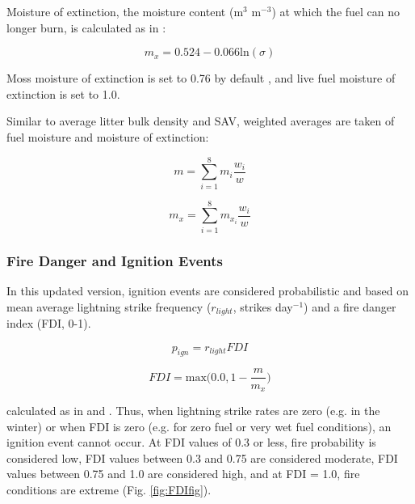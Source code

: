 \documentclass[a4paper, 12pt] {report}
\begin{document}
Moisture of extinction, the moisture content (m$^3$ m$^{-3}$) at which the fuel can no longer burn, is calculated as in \cite{petersonModelingPostfireConifer1986}:

\begin{equation}
	m_x = 0.524 - 0.066\text{ln}(\sigma) 
\end{equation}

Moss moisture of extinction is set to 0.76 by default \cite{frandsenIgnitionProbabilityOrganic1997}, and live fuel moisture of extinction is set to 1.0.

Similar to average litter bulk density and SAV, weighted averages are taken of fuel moisture and moisture of extinction:

\begin{equation} 
	m = \sum_{i=1}^{8} m_i\frac{w_i}{w}
\end{equation}

\begin{equation} 
	m_x = \sum_{i=1}^{8} m_{x_i}\frac{w_i}{w}
\end{equation}

\subsubsection{Fire Danger and Ignition Events}

In this updated version, ignition events are considered probabilistic and based on mean average lightning strike frequency ($r_{light}$, strikes day$^{-1}$) and a fire danger index (FDI, 0-1).

\begin{equation} 
	p_{ign} = r_{light}FDI
\end{equation}

\begin{equation} 
	FDI = \text{max}\Big(0.0, 1 - \frac{m}{m_x}\Big)
\end{equation}

calculated as in  and . Thus, when lightning strike rates are zero (e.g. in the winter) or when FDI is zero (e.g. for zero fuel or very wet fuel conditions), an ignition event cannot occur. At FDI values of 0.3 or less, fire probability is considered low, FDI values between 0.3 and 0.75 are considered moderate, FDI values between 0.75 and 1.0 are considered high, and at FDI = 1.0, fire conditions are extreme (Fig. \ref{fig:FDIfig}).
\end{document}
